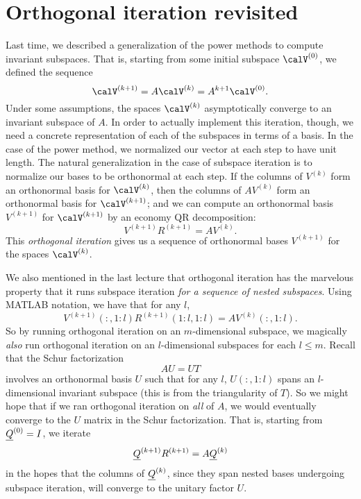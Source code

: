 \section{Orthogonal iteration revisited}

Last time, we described a generalization of the power methods to
compute invariant subspaces.  That is, starting from some initial
subspace $\calV^{(0)}$, we defined the sequence
\[
  \calV^{(k+1)} = A \calV^{(k)} = A^{k+1} \calV^{(0)}.
\]
Under some assumptions, the spaces $\calV^{(k)}$ asymptotically converge
to an invariant subspace of $A$.
In order to actually implement this iteration, though, we need
a concrete representation of each of the subspaces in terms of a basis.
In the case of the power method, we normalized our vector at each step
to have unit length.  The natural generalization in the case of
subspace iteration is to normalize our bases to be orthonormal at each
step.  If the columns of $V^{(k)}$ form an orthonormal basis for
$\calV^{(k)}$, then the columns of $AV^{(k)}$ form an orthonormal
basis for $\calV^{(k+1)}$; and we can compute an orthonormal basis
$V^{(k+1)}$ for $\calV^{(k+1)}$ by an economy QR decomposition:
\[
  V^{(k+1)} R^{(k+1)} = A V^{(k)}.
\]
This {\em orthogonal iteration} gives us a sequence of orthonormal
bases $V^{(k+1)}$ for the spaces $\calV^{(k)}$.

We also mentioned in the last lecture that orthogonal iteration has
the marvelous property that it runs subspace iteration
{\em for a sequence of nested subspaces}.  Using MATLAB notation,
we have that for any $l$,
\[
  V^{(k+1)}(:,1:l) R^{(k+1)}(1:l,1:l) = A V^{(k)}(:,1:l).
\]
So by running orthogonal iteration on an $m$-dimensional subspace,
we magically {\em also} run orthogonal iteration on an $l$-dimensional
subspaces for each $l \leq m$.  Recall that the Schur factorization
\[
  AU = UT
\]
involves an orthonormal basis $U$ such that for any $l$,
$U(:,1:l)$ spans an $l$-dimensional invariant subspace
(this is from the triangularity of $T$).  So we might hope that
if we ran orthogonal iteration on {\em all} of $A$, we would
eventually converge to the $U$ matrix in the Schur factorization.
That is, starting from $\underline{Q}^{(0)} = I$, we iterate
\begin{equation} \label{orth-iter-def}
  \underline{Q}^{(k+1)} R^{(k+1)} = A \underline{Q}^{(k)}
\end{equation}
in the hopes that the columns of $\underline{Q}^{(k)}$, since they span
nested bases undergoing subspace iteration, will converge
to the unitary factor $U$.

